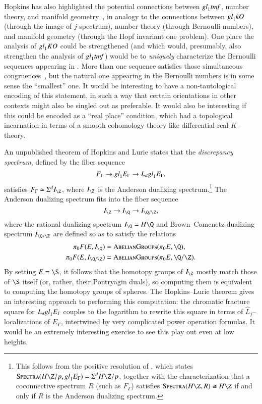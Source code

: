 Hopkins has also highlighted the potential connections between $\mathit{gl}_1 \mathit{tmf}$, number theory, and manifold geometry~\cite{HopkinsTheStringOrientation}, in analogy to the connections between $\mathit{gl}_1 kO$ (through the image of $j$ spectrum), number theory (through Bernoulli numbers), and manifold geometry (through the Hopf invariant one problem).  One place the analysis of $\mathit{gl}_1 KO$ could be strengthened (and which would, presumably, also strengthen the analysis of $\mathit{gl}_1 \mathit{tmf}$) would be to \emph{uniquely} characterize the Bernoulli sequences appearing in .  More than one sequence satisfies those simultaneous congruences~\cite{SprangNaumann}, but the natural one appearing in the Bernoulli numbers is in some sense the ``smallest'' one.  It would be interesting to have a non-tautological encoding of this statement, in such a way that certain orientations in other contexts might also be singled out as preferable.  It would also be interesting if this could be encoded as a ``real place'' condition, which had a topological incarnation in terms of a smooth cohomology theory like differential real $K$--theory.

An unpublished theorem of Hopkins and Lurie states that the \textit{discrepancy spectrum}, defined by the fiber sequence \[F_\Gamma \to \mathit{gl}_1 E_\Gamma \to L_d \mathit{gl}_1 E_\Gamma,\] satisfies $F_\Gamma \simeq \Susp^d I_{\Z}$, where $I_{\Z}$ is the Anderson dualizing spectrum.\footnote{This follows from the positive resolution of \cite[Conjecture 5.4.14]{HopkinsLurie}, which states $\CatOf{Spectra}(H\Z/p, \gl_1 E_\Gamma) = \Susp^d H\Z/p$, together with the characterization that a coconnective spectrum $R$ (such as $F_\Gamma$) satisfies $\CatOf{Spectra}(H\Z, R) \cong H\Z$ if and only if $R$ is the Anderson dualizing spectrum.}  The Anderson dualizing spectrum fits into the fiber sequence \[I_{\Z} \to I_{\Q} \to I_{\Q/\Z},\] where the rational dualizing spectrum $I_{\Q} = H\Q$ and Brown--Comenetz dualizing spectrum $I_{\Q/\Z}$ are defined so as to satisfy the relations
\begin{align*}
\pi_0 F(E, I_{\Q}) & = \CatOf{AbelianGroups}(\pi_0 E, \Q), \\
\pi_0 F(E, I_{\Q/\Z}) & = \CatOf{AbelianGroups}(\pi_0 E, \Q/\Z).
\end{align*}
By setting $E = \S$, it follows that the homotopy groups of $I_{\Z}$ mostly match those of $\S$ itself (or, rather, their Pontryagin duals), so computing them is equivalent to computing the homotopy groups of spheres.  The Hopkins--Lurie theorem gives an interesting approach to performing this computation: the chromatic fracture square for $L_d \mathit{gl}_1 E_\Gamma$ couples to the logarithm to rewrite this square in terms of $\widehat L_j$--localizations of $E_\Gamma$, intertwined by very complicated power operation formulas.  It would be an extremely interesting exercise to see this play out even at low heights.


